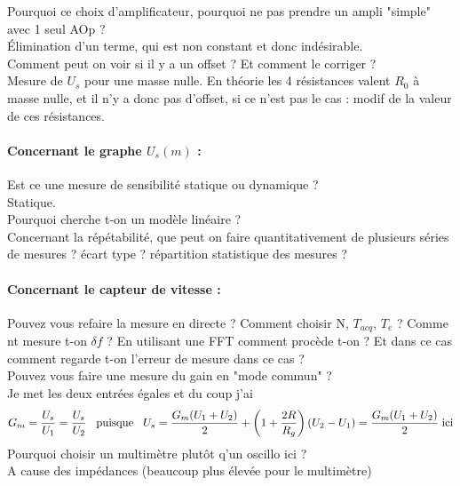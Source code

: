 \documentclass[12pt,prb,aps,epsf]{report}
\begin{document}
Pourquoi ce choix d'amplificateur, pourquoi ne pas prendre un ampli "simple" avec 1 seul AOp ?\\
Élimination d'un terme, qui est non constant et donc indésirable.\\

Comment peut on voir si il y a un offset ? Et comment le corriger ?\\
Mesure de $U_s$ pour une masse nulle. En théorie les 4 résistances valent $R_0$ à masse nulle, et il n'y a donc pas d'offset, si ce n'est pas le cas : modif de la valeur de ces résistances.\\

\paragraph{Concernant le graphe $U_s(m)$ :}
Est ce une mesure de sensibilité statique ou dynamique ?\\
Statique.\\
Pourquoi cherche t-on un modèle linéaire ?\\
Concernant la répétabilité, que peut on faire quantitativement de plusieurs séries de mesures ? écart type ? répartition statistique des mesures ?\\

\paragraph{Concernant le capteur de vitesse :} 
Pouvez vous refaire la mesure en directe ? Comment choisir N, $T_{acq}$, $T_e$ ? Comme nt mesure t-on $\delta f$ ? En utilisant une FFT comment procède t-on ? Et dans ce cas comment regarde t-on l'erreur de mesure dans ce cas ?\\

Pouvez vous faire une mesure du gain en "mode commun" ?\\
Je met les deux entrées égales et du coup j'ai 
\begin{eqnarray}
G_m = \frac{U_s}{U_1} = \frac{U_s}{U_2}\hspace{0.3cm}\mathrm{puisque}\hspace{0.3cm} U_s = \frac{G_m(U_1+U_2)}{2} + \left(1+\frac{2R}{R_g}\right)(U_2-U_1) = \frac{G_m(U_1+U_2)}{2} \; \mathrm{ici}
\end{eqnarray}
Pourquoi choisir un multimètre plutôt q'un oscillo ici ?\\
A cause des impédances (beaucoup plus élevée pour le multimètre) \\
\end{document}
